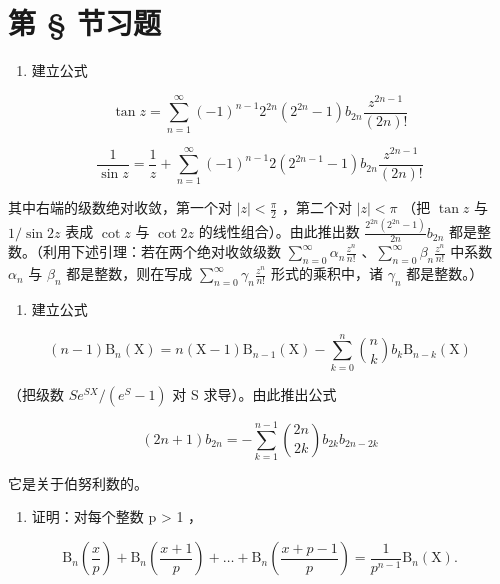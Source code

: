 \section*{第 \S{} 节习题}
{}

\begin{enumerate}
\def\labelenumi{\arabic{enumi})}
\tightlist
\item
  建立公式
\end{enumerate}

\[
\tan z = \sum_ {n = 1} ^ {\infty} (- 1) ^ {n - 1} 2 ^ {2 n} (2 ^ {2 n} - 1) b _ {2 n} \frac {z ^ {2 n - 1}}{(2 n) !}
\]

\[
\frac {1}{\sin z} = \frac {1}{z} + \sum_ {n = 1} ^ {\infty} (- 1) ^ {n - 1} 2 (2 ^ {2 n - 1} - 1) b _ {2 n} \frac {z ^ {2 n - 1}}{(2 n) !}
\]

其中右端的级数绝对收敛，第一个对 \(|z| < \frac{\pi}{2}\) ，第二个对 \(|z| < \pi\) （把 \(\tan z\) 与 \(1/\sin 2z\) 表成 \(\cot z\) 与 \(\cot 2z\) 的线性组合）。由此推出数 \(\frac{2^{2n}(2^{2n}-1)}{2n} b_{2n}\) 都是整数。（利用下述引理：若在两个绝对收敛级数 \(\sum_{n=0}^{\infty} \alpha_n \frac{z^n}{n!}\) 、\(\sum_{n=0}^{\infty} \beta_n \frac{z^n}{n!}\) 中系数 \(\alpha_n\) 与 \(\beta_n\) 都是整数，则在写成 \(\sum_{n=0}^{\infty} \gamma_n \frac{z^n}{n!}\) 形式的乘积中，诸 \(\gamma_n\) 都是整数。）

\begin{enumerate}
\def\labelenumi{\arabic{enumi})}
\setcounter{enumi}{1}
\tightlist
\item
  建立公式
\end{enumerate}

\[
(n - 1) \mathrm{B} _ {n} (\mathrm{X}) = n (\mathrm{X} - 1) \mathrm{B} _ {n - 1} (\mathrm{X}) - \sum_ {k = 0} ^ {n} \binom {n} {k} b _ {k}   \mathrm{B} _ {n - k} (\mathrm{X})
\]

（把级数 \(Se^{SX}/(e^{S}-1)\) 对 S 求导）。由此推出公式

\[
(2 n + 1) b _ {2 n} = - \sum_ {k = 1} ^ {n - 1} \binom {2 n} {2 k} b _ {2 k}   b _ {2 n - 2 k}
\]

它是关于伯努利数的。

\begin{enumerate}
\def\labelenumi{\arabic{enumi})}
\setcounter{enumi}{2}
\tightlist
\item
  证明：对每个整数 p \textgreater{} 1 ，
\end{enumerate}

\[
\mathrm{B} _ {n} \left(\frac {x}{p}\right) + \mathrm{B} _ {n} \left(\frac {x + 1}{p}\right) + \dots + \mathrm{B} _ {n} \left(\frac {x + p - 1}{p}\right) = \frac {1}{p ^ {n - 1}} \mathrm{B} _ {n} (\mathrm{X}).
\]

